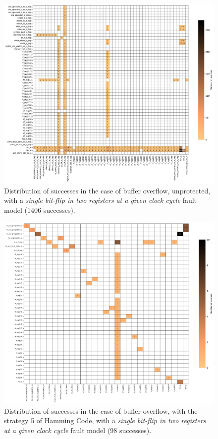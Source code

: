 \begin{figure}[ht]
    \centering
    \includegraphics[width=\textwidth]{c6_group_composition/img/heatmap_buffer_overflow_wop_1_single_bitflip_spatial_2.pdf}
    \caption{Distribution of successes in the case of buffer overflow, unprotected, with a \textit{single bit-flip in two registers at a given clock cycle} fault model (1406 successes).}
    \label{fig:heatmap_bo_spatial_wop}
\end{figure}

\begin{figure}[ht]
    \centering
    \includegraphics[width=\textwidth]{c6_group_composition/img/heatmap_buffer_overflow_hamming_5_single_bitflip_spatial_2.pdf}
    \caption{Distribution of successes in the case of buffer overflow, with the strategy 5 of Hamming Code, with a \textit{single bit-flip in two registers at a given clock cycle} fault model (98 successes).}
    \label{fig:heatmap_bo_spatial_hc5}
\end{figure}

